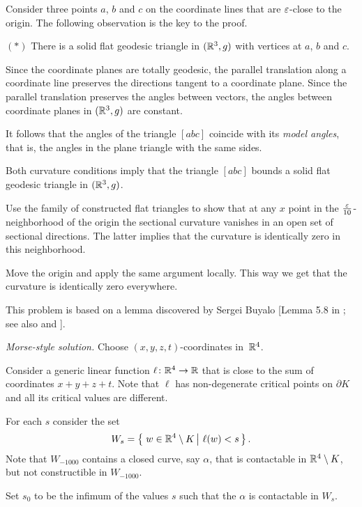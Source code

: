 Consider three points $a$, $b$ and $c$ on the coordinate lines that are $\varepsilon$-close 
to the origin.
The following observation is the key to the proof.

\begin{cl}{$({*})$}
There is a solid flat geodesic triangle in $(\mathbb{R}^3,g)$ with vertices at $a$, $b$ and $c$.
\end{cl}

Since the coordinate planes are totally geodesic, 
the parallel translation along a coordinate line preserves the directions tangent to a coordinate plane.
Since the parallel translation preserves the angles between vectors, the angles between coordinate planes in $(\mathbb{R}^3,g)$ are constant.

It follows that the angles of the triangle $[abc]$ coincide with its \emph{model angles},
that is, the angles in the plane triangle with the same sides.

Both curvature conditions imply that the triangle $[abc]$ bounds a solid flat geodesic triangle in   $(\mathbb{R}^3,g)$.

Use the family of constructed flat triangles to show that at any $x$ point in the $\tfrac{\varepsilon}{10}$-neighborhood of the origin the sectional curvature vanishes in an open set of sectional directions.
The latter implies that the curvature is identically zero 
in this neighborhood.

Move the origin and apply the same argument locally.
This way we get that the curvature is identically zero everywhere.
\qeds

This problem is based on a lemma discovered by Sergei Buyalo [Lemma 5.8 in ; see also  and ].

\textit{Morse-style solution.}
Choose $(x,y,z,t)$-coordinates in~$\mathbb{R}^4$.

Consider a generic linear function $\ell\colon\mathbb{R}^4\to\mathbb{R}$ that is close to the sum of coordinates $x+y+z+t$.
Note that $\ell$
has non-degenerate critical points on $\partial K$ and all its critical values are different.

For each $s$ consider the set 
$$W_s=\set{w\in \RR^4\setminus K}{\ell(w)<s}.$$
Note that $W_{-1000}$ contains a closed curve, say $\alpha$, that is contactable in $\mathbb{R}^4\setminus K$, but not constructible in $W_{-1000}$.

Set $s_0$ to be the infimum of the values $s$ such that
the $\alpha$ is contactable in $W_s$.

